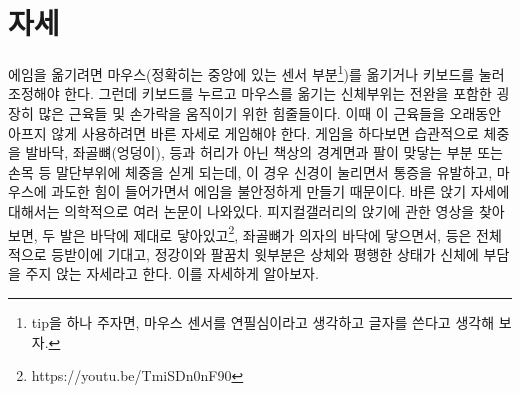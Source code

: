\section{자세}
에임을 옮기려면 마우스(정확히는 중앙에 있는 센서 부분\footnote{tip을 하나 주자면, 마우스 센서를 연필심이라고 생각하고 글자를 쓴다고 생각해 보자.})를 옮기거나 키보드를 눌러 조정해야 한다. 그런데 키보드를 누르고 마우스를 옮기는 신체부위는 전완을 포함한 굉장히 많은 근육들 및 손가락을 움직이기 위한 힘줄들이다. 이때 이 근육들을 오래동안 아프지 않게 사용하려면 바른 자세로 게임해야 한다. 게임을 하다보면 습관적으로 체중을 발바닥, 좌골뼈(엉덩이), 등과 허리가 아닌 책상의 경계면과 팔이 맞닿는 부분 또는 손목 등 말단부위에 체중을 싣게 되는데, 이 경우 신경이 눌리면서 통증을 유발하고, 마우스에 과도한 힘이 들어가면서 에임을 불안정하게 만들기 때문이다.
바른 앉기 자세에 대해서는 의학적으로 여러 논문이 나와있다. 피지컬갤러리의 앉기에 관한 영상\cite{pg_sitting}을 찾아보면, 두 발은 바닥에 제대로 닿아있고\footnote{https://youtu.be/TmiSDn0nF90}, 좌골뼈가 의자의 바닥에 닿으면서, 등은 전체적으로 등받이에 기대고, 정강이와 팔꿈치 윗부분은 상체와 평행한 상태가 신체에 부담을 주지 앉는 자세라고 한다. 이를 자세하게 알아보자.
